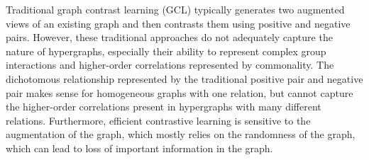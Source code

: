 
Traditional graph contrast learning (GCL) typically generates two augmented views of an existing graph and then contrasts them using positive and negative pairs\cite{velivckovic2018deep, peng2020graph, hassani2020contrastive, you2020graph, zhu2020deep}. However, these traditional approaches do not adequately capture the nature of hypergraphs, especially their ability to represent complex group interactions and higher-order correlations represented by commonality. The dichotomous relationship represented by the traditional positive pair and negative pair makes sense for homogeneous graphs with one relation, but cannot capture the higher-order correlations present in hypergraphs with many different relations. Furthermore, efficient contrastive learning is sensitive to the augmentation of the graph, which mostly relies on the randomness of the graph, which can lead to loss of important information in the graph.


